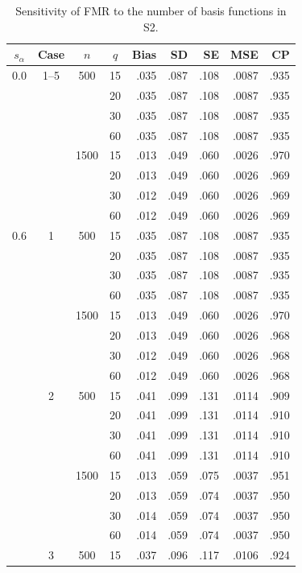 \begin{table}[H]\centering\small
\caption{Sensitivity of FMR to the number of basis functions in S2.}\label{tab:S2}
\begin{tabular}{ccccrrrrr}
\toprule
$s_\alpha$ & Case & $n$ & $q$ & Bias & SD & SE & MSE & CP \\
\midrule
0.0 & 1--5 & 500 & 15 & .035 & .087 & .108 & .0087 & .935 \\
 &  &  & 20 & .035 & .087 & .108 & .0087 & .935 \\
 &  &  & 30 & .035 & .087 & .108 & .0087 & .935 \\
 &  &  & 60 & .035 & .087 & .108 & .0087 & .935 \\
 &  & 1500 & 15 & .013 & .049 & .060 & .0026 & .970 \\
 &  &  & 20 & .013 & .049 & .060 & .0026 & .969 \\
 &  &  & 30 & .012 & .049 & .060 & .0026 & .969 \\
 &  &  & 60 & .012 & .049 & .060 & .0026 & .969 \\
0.6 & 1 & 500 & 15 & .035 & .087 & .108 & .0087 & .935 \\
 &  &  & 20 & .035 & .087 & .108 & .0087 & .935 \\
 &  &  & 30 & .035 & .087 & .108 & .0087 & .935 \\
 &  &  & 60 & .035 & .087 & .108 & .0087 & .935 \\
 &  & 1500 & 15 & .013 & .049 & .060 & .0026 & .970 \\
 &  &  & 20 & .013 & .049 & .060 & .0026 & .968 \\
 &  &  & 30 & .012 & .049 & .060 & .0026 & .968 \\
 &  &  & 60 & .012 & .049 & .060 & .0026 & .968 \\
 & 2 & 500 & 15 & .041 & .099 & .131 & .0114 & .909 \\
 &  &  & 20 & .041 & .099 & .131 & .0114 & .910 \\
 &  &  & 30 & .041 & .099 & .131 & .0114 & .910 \\
 &  &  & 60 & .041 & .099 & .131 & .0114 & .910 \\
 &  & 1500 & 15 & .013 & .059 & .075 & .0037 & .951 \\
 &  &  & 20 & .013 & .059 & .074 & .0037 & .950 \\
 &  &  & 30 & .014 & .059 & .074 & .0037 & .950 \\
 &  &  & 60 & .014 & .059 & .074 & .0037 & .950 \\
 & 3 & 500 & 15 & .037 & .096 & .117 & .0106 & .924 \\

\end{tabular}
\end{table}
